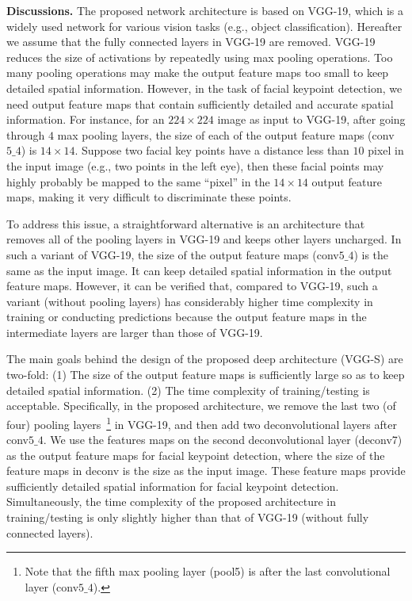\documentclass[journal]{IEEEtran}
\begin{document}
\textbf{Discussions.} The proposed network architecture is based on VGG-19, which is a widely used network for various vision tasks (e.g., object classification). Hereafter we assume that the fully connected layers in VGG-19 are removed. VGG-19 reduces the size of activations by repeatedly using max pooling operations. Too many pooling operations may make the output feature maps too small to keep detailed spatial information. However, in the task of facial keypoint detection, we need output feature maps that contain sufficiently detailed and accurate spatial information. For instance, for an $224 \times 224$ image as input to VGG-19, after going through $4$ max pooling layers, the size of each of the output feature maps (conv$5\_4$) is $14 \times 14$. Suppose two facial key points have a distance less than $10$ pixel in the input image (e.g., two points in the left eye), then these facial points may highly probably be mapped to the same ``pixel'' in the $14\times 14$ output feature maps, making it very difficult to discriminate these points.

To address this issue, a straightforward alternative is an architecture that removes all of the pooling layers in VGG-19 and keeps other layers uncharged. In such a variant of VGG-19, the size of the output feature maps (conv$5\_4$) is the same as the input image. It can keep detailed spatial information in the output feature maps. However, it can be verified that, compared to VGG-19, such a variant (without pooling layers) has considerably higher time complexity in training or conducting predictions because the output feature maps in the intermediate layers are larger than those of VGG-19.

The main goals behind the design of the proposed deep architecture (VGG-S) are two-fold: (1) The size of the output feature maps is sufficiently large so as to keep detailed spatial information. (2) The time complexity of training/testing is acceptable. Specifically, in the proposed architecture, we remove the last two (of four) pooling layers~\footnote{Note that the fifth max pooling layer (pool5) is after the last convolutional layer (conv$5\_4$). } in VGG-19, and then add two deconvolutional layers after conv$5\_4$. We use the features maps on the second deconvolutional layer (deconv7) as the output feature maps for facial keypoint detection, where the size of the feature maps in deconv is the size as the input image. These feature maps provide sufficiently detailed spatial information for facial keypoint detection. Simultaneously, the time complexity of the proposed architecture in training/testing is only slightly higher than that of VGG-19 (without fully connected layers).
\end{document}
